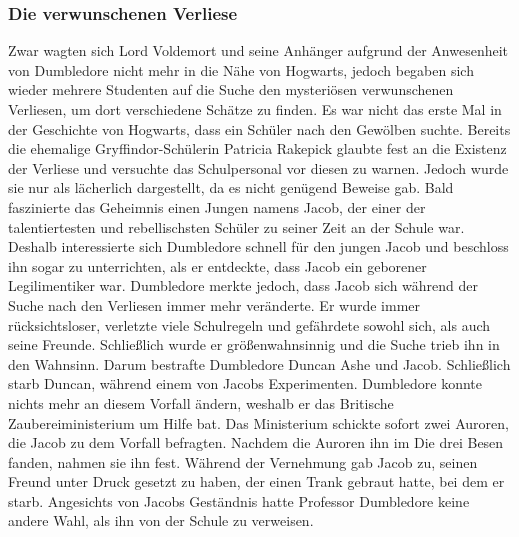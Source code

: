 \documentclass[a4paper, 10pt]{article}
\begin{document}
\subsubsection*{Die verwunschenen Verliese}
Zwar wagten sich Lord Voldemort und seine Anhänger aufgrund der Anwesenheit von Dumbledore nicht mehr in die Nähe von Hogwarts, jedoch begaben sich wieder mehrere Studenten auf die Suche den mysteriösen verwunschenen Verliesen, um dort verschiedene Schätze zu finden. Es war nicht das erste Mal in der Geschichte von Hogwarts, dass ein Schüler nach den Gewölben suchte. Bereits die ehemalige Gryffindor-Schülerin Patricia Rakepick glaubte fest an die Existenz der Verliese und versuchte das Schulpersonal vor diesen zu warnen. Jedoch wurde sie nur als lächerlich dargestellt, da es nicht genügend Beweise gab. Bald faszinierte das Geheimnis einen Jungen namens Jacob, der einer der talentiertesten und rebellischsten Schüler zu seiner Zeit an der Schule war. Deshalb interessierte sich Dumbledore schnell für den jungen Jacob und beschloss ihn sogar zu unterrichten, als er entdeckte, dass Jacob ein geborener Legilimentiker war.
\vspace{10pt}
\newline
{}  
Dumbledore merkte jedoch, dass Jacob sich während der Suche nach den Verliesen immer mehr veränderte. Er wurde immer rücksichtsloser, verletzte viele Schulregeln und gefährdete sowohl sich, als auch seine Freunde. Schließlich wurde er größenwahnsinnig und die Suche trieb ihn in den Wahnsinn. Darum bestrafte Dumbledore Duncan Ashe und Jacob. Schließlich starb Duncan, während einem von Jacobs Experimenten. Dumbledore konnte nichts mehr an diesem Vorfall ändern, weshalb er das Britische Zaubereiministerium um Hilfe bat. Das Ministerium schickte sofort zwei Auroren, die Jacob zu dem Vorfall befragten. Nachdem die Auroren ihn im Die drei Besen fanden, nahmen sie ihn fest. Während der Vernehmung gab Jacob zu, seinen Freund unter Druck gesetzt zu haben, der einen Trank gebraut hatte, bei dem er starb. Angesichts von Jacobs Geständnis hatte Professor Dumbledore keine andere Wahl, als ihn von der Schule zu verweisen.
\vspace{10pt}
\newline
{}  
\end{document}

